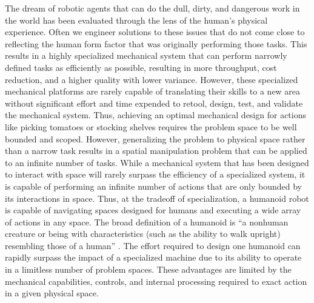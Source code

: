 \documentclass{article}
\begin{document}
The dream of robotic agents that can do the dull, dirty, and dangerous work in the world has been evaluated through the lens of the human's physical experience. Often we engineer solutions to these issues that do not come close to reflecting the human form factor that was originally performing those tasks. This results in a highly specialized mechanical system that can perform narrowly defined tasks as efficiently as possible, resulting in more throughput, cost reduction, and a higher quality with lower variance. However, these specialized mechanical platforms are rarely capable of translating their skills to a new area without significant effort and time expended to retool, design, test, and validate the mechanical system. Thus, achieving an optimal mechanical design for actions like picking tomatoes or stocking shelves requires the problem space to be well bounded and scoped. However, generalizing the problem to physical space rather than a narrow task results in a spatial manipulation problem that can be applied to an infinite number of tasks. While a mechanical system that has been designed to interact with space will rarely surpass the efficiency of a specialized system, it is capable of performing an infinite number of actions that are only bounded by its interactions in space. Thus, at the tradeoff of specialization, a humanoid robot is capable of navigating spaces designed for humans and executing a wide array of actions in any space. The broad definition of a humanoid is “a nonhuman creature or being with characteristics (such as the ability to walk upright) resembling those of a human” \cite{merriam2024}. The effort required to design one humanoid can rapidly surpass the impact of a specialized machine due to its ability to operate in a limitless number of problem spaces. These advantages are limited by the mechanical capabilities, controls, and internal processing required to exact action in a given physical space. 
\end{document}
